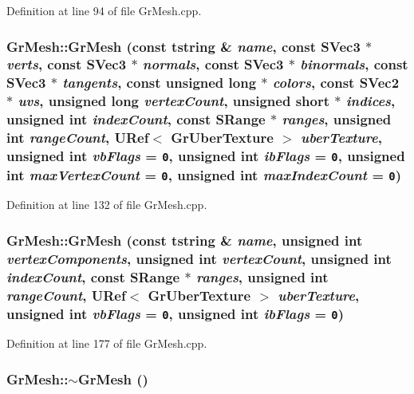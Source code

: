 Definition at line 94 of file GrMesh.cpp.\hypertarget{class_gr_mesh_fe2182b75dc1f6a02a096cea277872f8}{
\subsubsection[{GrMesh}]{\setlength{\rightskip}{0pt plus 5cm}GrMesh::GrMesh (const {\bf tstring} \& {\em name}, \/  const {\bf SVec3} $\ast$ {\em verts}, \/  const {\bf SVec3} $\ast$ {\em normals}, \/  const {\bf SVec3} $\ast$ {\em binormals}, \/  const {\bf SVec3} $\ast$ {\em tangents}, \/  const unsigned long $\ast$ {\em colors}, \/  const {\bf SVec2} $\ast$ {\em uvs}, \/  unsigned long {\em vertexCount}, \/  unsigned short $\ast$ {\em indices}, \/  unsigned int {\em indexCount}, \/  const {\bf SRange} $\ast$ {\em ranges}, \/  unsigned int {\em rangeCount}, \/  {\bf URef}$<$ {\bf GrUberTexture} $>$ {\em uberTexture}, \/  unsigned int {\em vbFlags} = {\tt 0}, \/  unsigned int {\em ibFlags} = {\tt 0}, \/  unsigned int {\em maxVertexCount} = {\tt 0}, \/  unsigned int {\em maxIndexCount} = {\tt 0})}}
\label{class_gr_mesh_fe2182b75dc1f6a02a096cea277872f8}




Definition at line 132 of file GrMesh.cpp.\hypertarget{class_gr_mesh_9ac6adeb0a429135ddce8487e65b05e9}{
\subsubsection[{GrMesh}]{\setlength{\rightskip}{0pt plus 5cm}GrMesh::GrMesh (const {\bf tstring} \& {\em name}, \/  unsigned int {\em vertexComponents}, \/  unsigned int {\em vertexCount}, \/  unsigned int {\em indexCount}, \/  const {\bf SRange} $\ast$ {\em ranges}, \/  unsigned int {\em rangeCount}, \/  {\bf URef}$<$ {\bf GrUberTexture} $>$ {\em uberTexture}, \/  unsigned int {\em vbFlags} = {\tt 0}, \/  unsigned int {\em ibFlags} = {\tt 0})}}
\label{class_gr_mesh_9ac6adeb0a429135ddce8487e65b05e9}




Definition at line 177 of file GrMesh.cpp.\hypertarget{class_gr_mesh_7c9e4336b2d7378db2ed663a06213d3d}{
\subsubsection[{$\sim$GrMesh}]{\setlength{\rightskip}{0pt plus 5cm}GrMesh::$\sim$GrMesh ()}}
\label{class_gr_mesh_7c9e4336b2d7378db2ed663a06213d3d}




